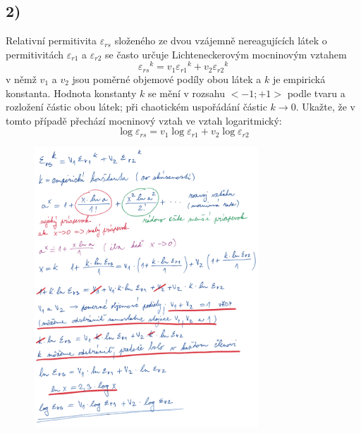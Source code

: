 \newpage


\subsection*{2)}
Relativní permitivita $\varepsilon_{rs}$ složeného ze dvou vzájemně nereagujících látek o permitivitách $\varepsilon_{r1}$ a $\varepsilon_{r2}$ se často určuje Lichteneckerovým mocninovým vztahem
\begin{equation}
    {{\varepsilon_{rs}}^k}={v_1{\varepsilon_{r1}}^k}+{v_2{\varepsilon_{r2}}^k}
\end{equation}
v němž $v_1$ a $v_2$ jsou poměrné objemové podíly obou látek a $k$ je empirická konstanta. Hodnota konstanty $k$ se mění v rozsahu $<-1; +1>$ podle tvaru a rozložení částic obou látek; při chaotickém uspořádání částic $k\rightarrow 0$. Ukažte, že v tomto případě přechází mocninový vztah ve vztah logaritmický:
\begin{equation}
    {\log{\varepsilon_{rs}}}={v_1\log{\varepsilon_{r1}}}+{v_2\log{\varepsilon_{r2}}}
\end{equation}

\begin{figure}[h]
    \centering
    \includegraphics*[width=0.75\textwidth]{images/diel2.jpg}
\end{figure}

